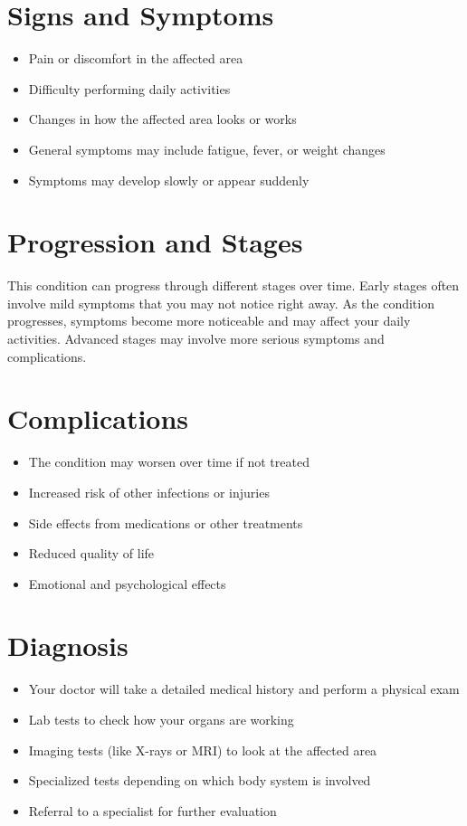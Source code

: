 \section{Signs and Symptoms}

\begin{itemize}[noitemsep]
  \item Pain or discomfort in the affected area
  \item Difficulty performing daily activities
  \item Changes in how the affected area looks or works
  \item General symptoms may include fatigue, fever, or weight changes
  \item Symptoms may develop slowly or appear suddenly
\end{itemize}

\section{Progression and Stages}
This condition can progress through different stages over time. Early stages often involve mild symptoms that you may not notice right away. As the condition progresses, symptoms become more noticeable and may affect your daily activities. Advanced stages may involve more serious symptoms and complications.

\section{Complications}

\begin{itemize}[noitemsep]
  \item The condition may worsen over time if not treated
  \item Increased risk of other infections or injuries
  \item Side effects from medications or other treatments
  \item Reduced quality of life
  \item Emotional and psychological effects
\end{itemize}

\section{Diagnosis}

\begin{itemize}[noitemsep]
  \item Your doctor will take a detailed medical history and perform a physical exam
  \item Lab tests to check how your organs are working
  \item Imaging tests (like X-rays or MRI) to look at the affected area
  \item Specialized tests depending on which body system is involved
  \item Referral to a specialist for further evaluation
\end{itemize}

